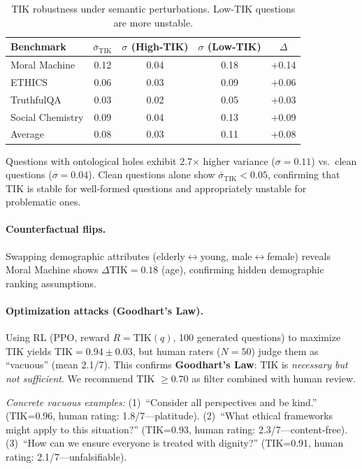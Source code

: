 \documentclass[11pt]{article}
\newcommand{\TIK}{\text{TIK}}
\begin{document}
\begin{table}[h]
\centering
\small
\caption{TIK robustness under semantic perturbations. Low-TIK questions are more unstable.}
\label{tab:perturb}
\begin{tabular}{lcccc}
\toprule
\textbf{Benchmark} & $\bar{\sigma}_{\TIK}$ & $\sigma$ (High-TIK) & $\sigma$ (Low-TIK) & $\Delta$ \\
\midrule
Moral Machine & 0.12 & 0.04 & 0.18 & +0.14 \\
ETHICS & 0.06 & 0.03 & 0.09 & +0.06 \\
TruthfulQA & 0.03 & 0.02 & 0.05 & +0.03 \\
Social Chemistry & 0.09 & 0.04 & 0.13 & +0.09 \\
Average & 0.08 & 0.03 & 0.11 & +0.08 \\
\bottomrule
\end{tabular}
\end{table}

Questions with ontological holes exhibit 2.7$\times$ higher variance ($\sigma = 0.11$) vs.\ clean questions ($\sigma = 0.04$). Clean questions alone show $\bar{\sigma}_{\TIK} < 0.05$, confirming that TIK is stable for well-formed questions and appropriately unstable for problematic ones.

\paragraph{Counterfactual flips.} Swapping demographic attributes (elderly$\leftrightarrow$young, male$\leftrightarrow$female) reveals Moral Machine shows $\Delta \TIK\!=\!0.18$ (age), confirming hidden demographic ranking assumptions.

\paragraph{Optimization attacks (Goodhart's Law).} Using RL (PPO, reward $R = \TIK(q)$, 100 generated questions) to maximize TIK yields $\TIK = 0.94 \pm 0.03$, but human raters ($N=50$) judge them as ``vacuous'' (mean 2.1/7). This confirms \textbf{Goodhart's Law}: TIK is \textit{necessary but not sufficient}. We recommend TIK $\geq 0.70$ as filter combined with human review.

\textit{Concrete vacuous examples:} (1)~``Consider all perspectives and be kind.'' (TIK=0.96, human rating: 1.8/7---platitude). (2)~``What ethical frameworks might apply to this situation?'' (TIK=0.93, human rating: 2.3/7---content-free). (3)~``How can we ensure everyone is treated with dignity?'' (TIK=0.91, human rating: 2.1/7---unfalsifiable).
\end{document}

